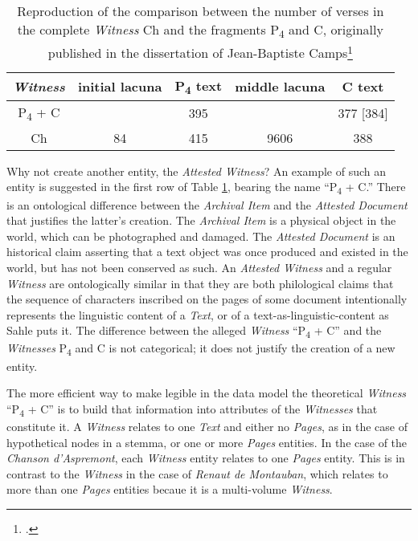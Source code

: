 \begin{table}[ht]
    \begin{center}
    \begin{tabular}{c||cccc}
        \textit{Witness} & initial lacuna & P\textsubscript{4} text & middle lacuna & C text \\
        \hline
        \hline
        P\textsubscript{4} + C & & 395 & & 377 [384] \\
        Ch & 84 & 415 & 9606 & 388
    \end{tabular}
    \end{center}
\caption{Reproduction of the comparison between the number of verses in the complete \textit{Witness} Ch and the fragments P\textsubscript{4} and C, originally published in the dissertation of Jean-Baptiste Camps\footcite[Table 1.3.][xcvii]{camps2016}}
\label{tab:CampsAspremont}
\end{table}

Why not create another entity, the \textit{Attested Witness}? An example of such an entity is suggested in the first row of Table \ref{tab:CampsAspremont}, bearing the name ``P\textsubscript{4} + C.'' There is an ontological difference between the \textit{Archival Item} and the \textit{Attested Document} that justifies the latter's creation. The \textit{Archival Item} is a physical object in the world, which can be photographed and damaged. The \textit{Attested Document} is an historical claim asserting that a text object was once produced and existed in the world, but has not been conserved as such. An \textit{Attested Witness} and a regular \textit{Witness} are ontologically similar in that they are both philological claims that the sequence of characters inscribed on the pages of some document intentionally represents the linguistic content of a \textit{Text}, or of a text-as-linguistic-content as Sahle puts it. The difference between the alleged \textit{Witness} ``P\textsubscript{4} + C'' and the \textit{Witnesses} P\textsubscript{4} and C is not categorical; it does not justify the creation of a new entity.

The more efficient way to make legible in the data model the theoretical \textit{Witness} ``P\textsubscript{4} + C'' is to build that information into attributes of the \textit{Witnesses} that constitute it. A \textit{Witness} relates to one \textit{Text} and either no \textit{Pages}, as in the case of hypothetical nodes in a stemma, or one or more \textit{Pages} entities. In the case of the \textit{Chanson d'Aspremont}, each \textit{Witness} entity relates to one \textit{Pages} entity. This is in contrast to the \textit{Witness} in the case of \textit{Renaut de Montauban}, which relates to more than one \textit{Pages} entities becaue it is a multi-volume \textit{Witness}.

